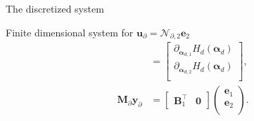 \documentclass[aspectratio=169]{ISAE-Beamer}
\begin{document}
\begin{frame}{The discretized system}
{\begin{exampleblock}{Finite dimensional system for $\bm{u}_\partial = \mathcal{N}_{\partial, 2} \displaystyle \bm{e}_2$}
\begin{equation*}
\begin{aligned}
					&= \begin{bmatrix}
						\partial_{\bm{\alpha}_{d, 1}} H_d(\bm{\alpha}_d)\\
						\partial_{\bm{\alpha}_{d, 2}} H_d(\bm{\alpha}_d)\\
					\end{bmatrix}, \\
					\mathbf{M}_\partial {\mathbf{y}_\partial} &= \begin{bmatrix}
						\mathbf{B}_1^\top & \mathbf{0}
					\end{bmatrix}\begin{pmatrix}
						\mathbf{e}_{1} \\
						\mathbf{e}_{2} \\
					\end{pmatrix}.
				\end{aligned}
			\end{equation*}
		\end{exampleblock}
	}
	
\end{frame}
\end{document}
